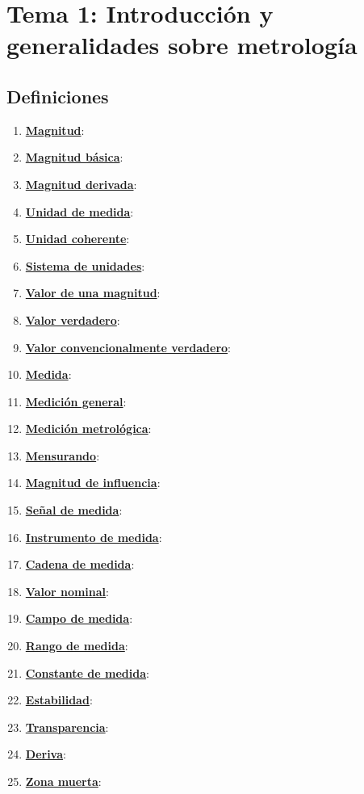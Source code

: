 
\section{Tema 1: Introducción y generalidades sobre metrología}
\subsection{Definiciones}
\begin{enumerate}
	\item \underline{\textbf{Magnitud}}: 
	\item \underline{\textbf{Magnitud básica}}:
	\item \underline{\textbf{Magnitud derivada}}:
	\item \underline{\textbf{Unidad de medida}}:
	\item \underline{\textbf{Unidad coherente}}:
	\item \underline{\textbf{Sistema de unidades}}:
	\item \underline{\textbf{Valor de una magnitud}}:
	\item \underline{\textbf{Valor verdadero}}:
	\item \underline{\textbf{Valor convencionalmente verdadero}}:
	\item \underline{\textbf{Medida}}:
	\item \underline{\textbf{Medición general}}:
	\item \underline{\textbf{Medición metrológica}}:
	\item \underline{\textbf{Mensurando}}:
	\item \underline{\textbf{Magnitud de influencia}}:
	\item \underline{\textbf{Señal de medida}}:
	\item \underline{\textbf{Instrumento de medida}}:
	\item \underline{\textbf{Cadena de medida}}:
	\item \underline{\textbf{Valor nominal}}:
	\item \underline{\textbf{Campo de medida}}:
	\item \underline{\textbf{Rango de medida}}:
	\item \underline{\textbf{Constante de medida}}:
	\item \underline{\textbf{Estabilidad}}:
	\item \underline{\textbf{Transparencia}}:
	\item \underline{\textbf{Deriva}}:
	\item \underline{\textbf{Zona muerta}}:

\end{enumerate}
